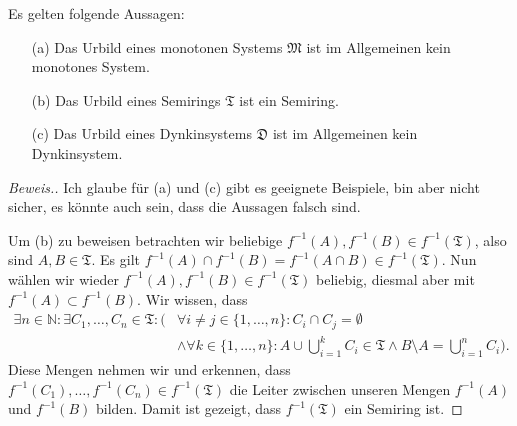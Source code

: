 \begin{lemma}
    Es gelten folgende Aussagen:
    \begin{itemize}
        \item[(a)] Das Urbild eines monotonen Systems $\mathfrak{M}$ ist im Allgemeinen kein monotones System.
        \item[(b)] Das Urbild eines Semirings $\mathfrak{T}$ ist ein Semiring.
        \item[(c)] Das Urbild eines Dynkinsystems $\mathfrak{D}$ ist im Allgemeinen kein Dynkinsystem.  
    \end{itemize}
\end{lemma}

\begin{proof}[Beweis.]
    Ich glaube für (a) und (c) gibt es geeignete Beispiele, bin aber nicht sicher, es könnte auch sein, dass die Aussagen falsch sind.
    
    Um (b) zu beweisen betrachten wir beliebige $f^{-1}(A),f^{-1}(B)\in f^{-1}(\mathfrak{T})$, also sind $A,B\in\mathfrak{T}$. Es gilt $f^{-1}(A)\cap f^{-1}(B)=f^{-1}(A\cap B)\in f^{-1}(\mathfrak{T})$. Nun wählen wir wieder $f^{-1}(A),f^{-1}(B)\in f^{-1}(\mathfrak{T})$ beliebig, diesmal aber mit $f^{-1}(A)\subset f^{-1}(B)$. Wir wissen, dass 
    \begin{align*}
        \exists n\in\mathbb{N}:\exists C_1,\dots,C_n\in\mathfrak{T}:\biggl(&\forall i\neq j\in\{1,\dots,n\}:C_i\cap C_j=\emptyset\\
        &\land\forall k\in\{1,\dots,n\}:A\cup\bigcup_{i=1}^kC_i\in\mathfrak{T}\land B\setminus A=\bigcup_{i=1}^nC_i\biggr).
    \end{align*}
    Diese Mengen nehmen wir und erkennen, dass $f^{-1}(C_1),\dots,f^{-1}(C_n)\in f^{-1}(\mathfrak{T})$ die Leiter zwischen unseren Mengen $f^{-1}(A)$ und $f^{-1}(B)$ bilden. Damit ist gezeigt, dass $f^{-1}(\mathfrak{T})$ ein Semiring ist.
\end{proof}